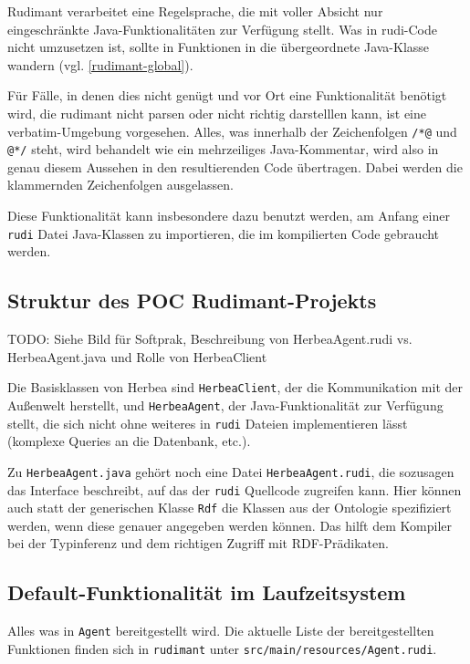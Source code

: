 Rudimant verarbeitet eine Regelsprache, die mit voller Absicht nur
eingeschränkte Java-Funktionalitäten zur Verfügung stellt. Was in rudi-Code
nicht umzusetzen ist, sollte in Funktionen in die übergeordnete Java-Klasse
wandern (vgl. \ref{rudimant-global}).

Für Fälle, in denen dies nicht genügt und vor Ort eine Funktionalität benötigt
wird, die rudimant nicht parsen oder nicht richtig darstelllen kann, ist eine
verbatim-Umgebung vorgesehen. Alles, was innerhalb der Zeichenfolgen \verb|/*@|
und \verb|@*/| steht, wird behandelt wie ein mehrzeiliges Java-Kommentar, wird
also in genau diesem Aussehen in den resultierenden Code übertragen. Dabei
werden die klammernden Zeichenfolgen ausgelassen.

Diese Funktionalität kann insbesondere dazu benutzt werden, am Anfang einer
\texttt{rudi} Datei Java-Klassen zu importieren, die im kompilierten Code
gebraucht werden.

\subsection{Struktur des POC Rudimant-Projekts}

TODO: Siehe Bild für Softprak, Beschreibung von HerbeaAgent.rudi
vs. HerbeaAgent.java und Rolle von HerbeaClient

Die Basisklassen von Herbea sind \texttt{HerbeaClient}, der die Kommunikation
mit der Außenwelt herstellt, und \texttt{HerbeaAgent}, der Java-Funktionalität
zur Verfügung stellt, die sich nicht ohne weiteres in \texttt{rudi} Dateien
implementieren lässt (komplexe Queries an die Datenbank, etc.).

Zu \texttt{HerbeaAgent.java} gehört noch eine Datei \texttt{HerbeaAgent.rudi},
die sozusagen das Interface beschreibt, auf das der \texttt{rudi} Quellcode
zugreifen kann. Hier können auch statt der generischen Klasse \texttt{Rdf} die
Klassen aus der Ontologie spezifiziert werden, wenn diese genauer angegeben
werden können. Das hilft dem Kompiler bei der Typinferenz und dem richtigen
Zugriff mit RDF-Prädikaten.

\subsection{Default-Funktionalität im Laufzeitsystem}
Alles was in \texttt{Agent} bereitgestellt wird. Die aktuelle Liste der
bereitgestellten Funktionen finden sich in \texttt{rudimant} unter
\texttt{src/main/resources/Agent.rudi}.


